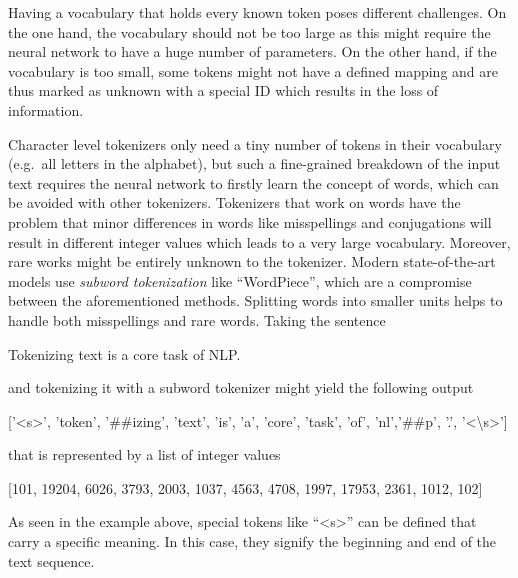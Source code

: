 Having a vocabulary that holds every known token poses different challenges.
On the one hand, the vocabulary should not be too large as this might require the neural network to have a huge number of parameters.
On the other hand, if the vocabulary is too small, some tokens might not have a defined mapping and are thus marked as unknown with a special ID which results in the loss of information.

Character level tokenizers only need a tiny number of tokens in their vocabulary (e.g.\ all letters in the alphabet), but such a fine-grained breakdown of the input text requires the neural network to firstly learn the concept of words, which can be avoided with other tokenizers.
Tokenizers that work on words have the problem that minor differences in words like misspellings and conjugations will result in different integer values which leads to a very large vocabulary.
Moreover, rare works might be entirely unknown to the tokenizer.
Modern state-of-the-art models use \textit{subword tokenization} like \enquote{WordPiece}, which are a compromise between the aforementioned methods.
Splitting words into smaller units helps to handle both misspellings and rare words.
Taking the sentence

\begin{center}
\colorbox{goodgreen!15}{
    \begin{minipage}{0.5\textwidth}
        Tokenizing text is a core task of NLP.
    \end{minipage}
}
\end{center}

and tokenizing it with a subword tokenizer might yield the following output
\begin{center}
\colorbox{goodgreen!15}{
    \centering
    \begin{minipage}{0.9\textwidth}
    ['<s>', 'token', '\#\#izing', 'text', 'is', 'a', 'core', 'task', 'of', 'nl','\#\#p', '.', '<\backslash s>']
    \end{minipage}
}
\end{center}
that is represented by a list of integer values
\begin{center}
    \colorbox{goodgreen!15}{
        \centering
        \begin{minipage}{\textwidth}
        [101, 19204, 6026, 3793, 2003, 1037, 4563, 4708, 1997, 17953, 2361, 1012, 102]
        \end{minipage}
    }
\end{center}
As seen in the example above, special tokens like \enquote{<s>} can be defined that carry a specific meaning.
In this case, they signify the beginning and end of the text sequence.

